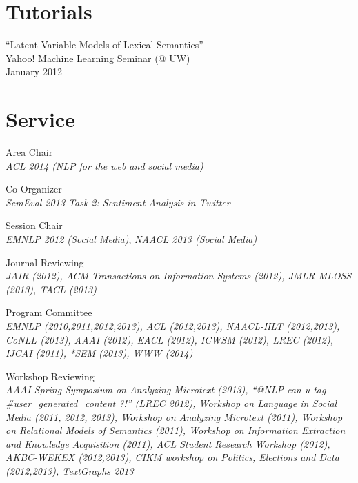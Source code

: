 \documentclass[margin,line]{res}
\begin{document}
\begin{resume}
\section{\sc Tutorials}
``Latent Variable Models of Lexical Semantics'' \\
Yahoo! Machine Learning Seminar (@ UW) \\
January 2012


\begin{comment}
``Profiling NAVDAS'' \\
Naval Research Laboratory Monterey, CA \\
August 2006

``Profiling Parallel Fortran/MPI programs using TAU'' (Training Class for NRL Scientists) \\
Naval Research Laboratory Monterey, CA \\
August 2006
\end{comment}

\section{\sc Service}
Area Chair \\
\emph{ACL 2014 (NLP for the web and social media)}

Co-Organizer \\
\emph{SemEval-2013 Task 2: Sentiment Analysis in Twitter}

Session Chair \\
\emph{EMNLP 2012 (Social Media)}, \emph{NAACL 2013 (Social Media)}

Journal Reviewing \\
\emph{JAIR (2012), ACM Transactions on Information Systems (2012), JMLR MLOSS (2013), TACL (2013)}

Program Committee \\
\emph{EMNLP (2010,2011,2012,2013), ACL (2012,2013), NAACL-HLT (2012,2013), CoNLL (2013), AAAI (2012), EACL (2012), ICWSM (2012), LREC (2012), IJCAI (2011), *SEM (2013), WWW (2014)}

Workshop Reviewing \\
\emph{AAAI Spring Symposium on Analyzing Microtext (2013), ``@NLP can u tag \#user\_generated\_content ?!'' (LREC 2012), Workshop on Language in Social Media (2011, 2012, 2013), Workshop on Analyzing Microtext (2011), Workshop on Relational Models of Semantics (2011), Workshop on Information Extraction and Knowledge Acquisition (2011), ACL Student Research Workshop (2012), AKBC-WEKEX (2012,2013), CIKM workshop on Politics, Elections and Data (2012,2013), TextGraphs 2013}


\end{resume}
\end{document}
